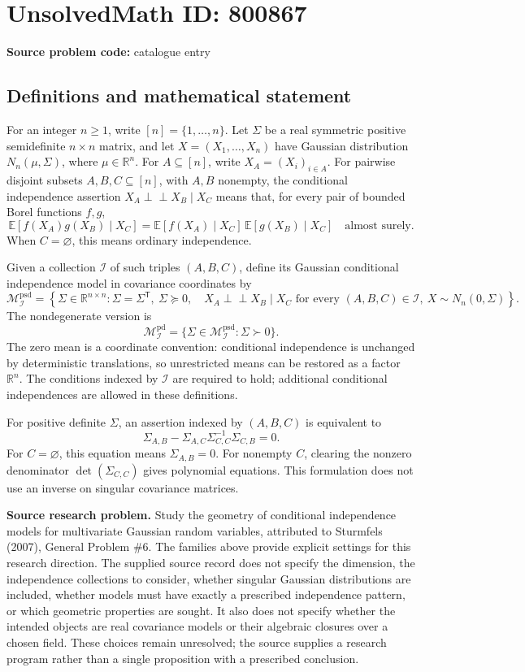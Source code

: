 \documentclass[11pt]{article}
\newcommand{\R}{\mathbb{R}}
\newcommand{\E}{\mathbb{E}}
\begin{document}
\section*{UnsolvedMath ID: 800867}
\textbf{Source problem code:} catalogue entry
\subsection{Definitions and mathematical statement}
For an integer \(n\geq 1\), write \([n]=\{1,\ldots,n\}\). Let \(\Sigma\) be a real symmetric positive semidefinite \(n\times n\) matrix, and let \(X=(X_1,\ldots,X_n)\) have Gaussian distribution \(N_n(\mu,\Sigma)\), where \(\mu\in\R^n\). For \(A\subseteq[n]\), write \(X_A=(X_i)_{i\in A}\). For pairwise disjoint subsets \(A,B,C\subseteq[n]\), with \(A,B\) nonempty, the conditional independence assertion \(X_A\perp\!\!\!\perp X_B\mid X_C\) means that, for every pair of bounded Borel functions \(f,g\),
\[
\E[f(X_A)g(X_B)\mid X_C]
=
\E[f(X_A)\mid X_C]\,\E[g(X_B)\mid X_C]
\quad\text{almost surely}.
\]
When \(C=\varnothing\), this means ordinary independence.

Given a collection \(\mathcal I\) of such triples \((A,B,C)\), define its Gaussian conditional independence model in covariance coordinates by
\[
\mathcal M_{\mathcal I}^{\mathrm{psd}}
=
\left\{\Sigma\in\R^{n\times n}:
\Sigma=\Sigma^{\mathsf T},\ \Sigma\succeq0,\quad
X_A\perp\!\!\!\perp X_B\mid X_C
\text{ for every }(A,B,C)\in\mathcal I,
\ X\sim N_n(0,\Sigma)
\right\}.
\]
The nondegenerate version is
\[
\mathcal M_{\mathcal I}^{\mathrm{pd}}
=\{\Sigma\in\mathcal M_{\mathcal I}^{\mathrm{psd}}:\Sigma\succ0\}.
\]
The zero mean is a coordinate convention: conditional independence is unchanged by deterministic translations, so unrestricted means can be restored as a factor \(\R^n\). The conditions indexed by \(\mathcal I\) are required to hold; additional conditional independences are allowed in these definitions.

For positive definite \(\Sigma\), an assertion indexed by \((A,B,C)\) is equivalent to
\[
\Sigma_{A,B}-\Sigma_{A,C}\Sigma_{C,C}^{-1}\Sigma_{C,B}=0.
\]
For \(C=\varnothing\), this equation means \(\Sigma_{A,B}=0\). For nonempty \(C\), clearing the nonzero denominator \(\det(\Sigma_{C,C})\) gives polynomial equations. This formulation does not use an inverse on singular covariance matrices.

\textbf{Source research problem.} Study the geometry of conditional independence models for multivariate Gaussian random variables, attributed to Sturmfels (2007), General Problem \#6. The families above provide explicit settings for this research direction. The supplied source record does not specify the dimension, the independence collections to consider, whether singular Gaussian distributions are included, whether models must have exactly a prescribed independence pattern, or which geometric properties are sought. It also does not specify whether the intended objects are real covariance models or their algebraic closures over a chosen field. These choices remain unresolved; the source supplies a research program rather than a single proposition with a prescribed conclusion.
\end{document}
